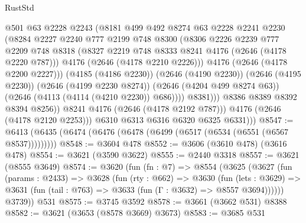 \begin{lexlean}{RustStd}
\begin{coremodule}
                          @501
                          @63
                          @2228
                          @2243
                          (@8181
                            @499
                            @492
                            @8274
                            @63
                            @2228
                            @2241
                            @2230
                            (@8284
                              @2227
                              @2240
                              @777
                              @2199
                              @748
                              @8300
                              (@8306
                                @2226
                                @2239
                                @777
                                @2209
                                @748
                                @8318
                                (@8327 @2219 @748 @8333 @8241 @4176 (@2646 (@4178 @2220 @787)))
                                @4176
                                (@2646 (@4178 @2210 @2226)))
                              @4176
                              (@2646 (@4178 @2200 @2227)))
                            (@4185 (@4186 @2230))
                            (@2646 (@4190 @2230))
                            (@2646 (@4195 @2230))
                            (@2646 (@4199 @2230 @8274))
                            (@2646 (@4204 @499 @8274 @63))
                            (@2646 (@4113 (@4114 (@4210 @2230)) @686))))
                        @8381)))
                  @8386
                  @8389
                  @8392
                  @8394
                  @8256))
              @8241
              @4176
              (@2646 (@4178 @2192 @787)))
            @4176
            (@2646 (@4178 @2120 @2253)))
          @6310
          @6313
          @6316
          @6320
          @6325
          @6331)))
@8547 := @6413 (@6435 (@6474 (@6476 (@6478 (@6499 (@6517 (@6534 (@6551 (@6567 @8537)))))))))
@8548 := @3604 @478
@8552 := @3606 (@3610 @478) (@3616 @478)
@8554 := @3621 (@3590 @3622)
@8555 := @2440 @3318
@8557 := @3621 (@8555 @3649)
@8574 := @3620
    (fun (fn : @7) =>
    @8554
      (@3625
        (@3627
          (fun (params : @2433) =>
          @3628
            (fun (rty : @662) =>
            @3630
              (fun (lets : @3629) =>
              @3631 (fun (tail : @763) => @3633 (fun (Γ : @3632) => @8557 @3694))))))
        @3739))
    @531
@8575 := @3745 @3592
@8578 := @3661 (@3662 @531) @8388
@8582 := @3621 (@3653 (@8578 @3669) @3673)
@8583 := @3685 @531

\end{coremodule}
\end{lexlean}
